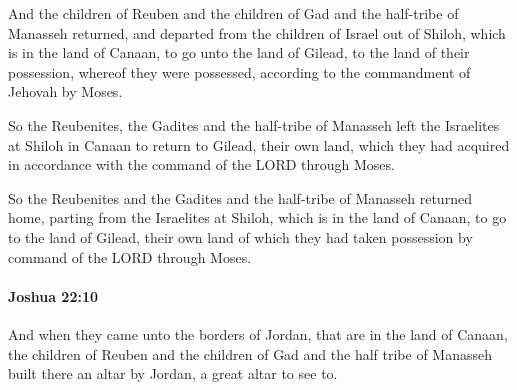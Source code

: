 			\begin{versebox}
					\item[BHS] 
					\item[ASV] And the children of Reuben and the children of Gad and the half-tribe of Manasseh returned, and departed from the children of Israel out of Shiloh, which is in the land of Canaan, to go unto the land of Gilead, to the land of their possession, whereof they were possessed, according to the commandment of Jehovah by Moses.
					\item[NIV] So the Reubenites, the Gadites and the half-tribe of Manasseh left the Israelites at Shiloh in Canaan to return to Gilead, their own land, which they had acquired in accordance with the command of the LORD through Moses.
					\item[NRSV] So the Reubenites and the Gadites and the half-tribe of Manasseh returned home, parting from the Israelites at Shiloh, which is in the land of Canaan, to go to the land of Gilead, their own land of which they had taken possession by command of the LORD through Moses.
			\end{versebox}

		\paragraph{Joshua 22:10} %
			\label{JOSHUA-22-10}

			And when they came unto the borders of Jordan, that are in the land of Canaan, the children of Reuben and the children of Gad and the half tribe of Manasseh built there an altar by Jordan, a great altar to see to.

